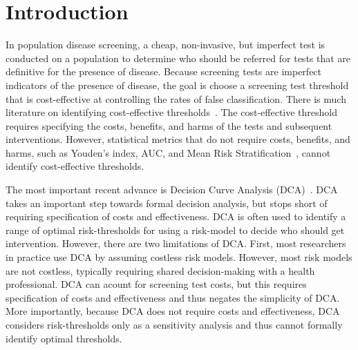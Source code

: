\documentclass[AMA,STIX1COL]{WileyNJD-v2}
\begin{document}


\maketitle









\section{Introduction}
\label{sec:intro}
In population disease screening, a cheap, non-invasive, but imperfect test is conducted on a population to determine who should be referred for tests that are definitive for the presence of disease.   Because screening tests are imperfect indicators of the presence of disease, the goal is choose a screening test threshold that is cost-effective at controlling the rates of false classification.  There is much literature on identifying cost-effective thresholds~\citep{Pauker1980,Gail2005,Baker2009a}.  The cost-effective threshold requires specifying the costs, benefits, and harms of the tests and subsequent interventions.  However, statistical metrics that do not require costs, benefits, and harms, such as Youden's index, AUC, and Mean Risk Stratification~\citep{Katki2019}, cannot identify cost-effective thresholds.  

The most important recent advance is Decision Curve Analysis (DCA)~\citep{Vickers2006}.  DCA takes an important step towards formal decision analysis, but stops short of requiring specification of costs and effectiveness.  DCA is often used to identify a range of optimal risk-thresholds for using a risk-model to decide who should get intervention. However, there are two limitations of DCA.  First, most researchers in practice use DCA by assuming costless risk models. However, most risk models are not costless, typically requiring shared decision-making with a health professional.  DCA can acount for screening test costs, but this requires specification of costs and effectiveness and thus negates the simplicity of DCA.  More importantly, because DCA does not require costs and effectiveness, DCA considers risk-thresholds only as a sensitivity analysis and thus cannot formally identify optimal thresholds.
\end{document}
